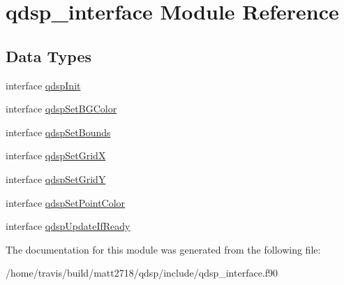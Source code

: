 \hypertarget{classqdsp__interface}{\section{qdsp\-\_\-interface Module Reference}
\label{classqdsp__interface}
}
\subsection*{Data Types}
\begin{DoxyCompactItemize}
\item 
interface \hyperlink{interfaceqdsp__interface_1_1qdspInit}{qdsp\-Init}
\item 
interface \hyperlink{interfaceqdsp__interface_1_1qdspSetBGColor}{qdsp\-Set\-B\-G\-Color}
\item 
interface \hyperlink{interfaceqdsp__interface_1_1qdspSetBounds}{qdsp\-Set\-Bounds}
\item 
interface \hyperlink{interfaceqdsp__interface_1_1qdspSetGridX}{qdsp\-Set\-Grid\-X}
\item 
interface \hyperlink{interfaceqdsp__interface_1_1qdspSetGridY}{qdsp\-Set\-Grid\-Y}
\item 
interface \hyperlink{interfaceqdsp__interface_1_1qdspSetPointColor}{qdsp\-Set\-Point\-Color}
\item 
interface \hyperlink{interfaceqdsp__interface_1_1qdspUpdateIfReady}{qdsp\-Update\-If\-Ready}
\end{DoxyCompactItemize}


The documentation for this module was generated from the following file\-:\begin{DoxyCompactItemize}
\item 
/home/travis/build/matt2718/qdsp/include/qdsp\-\_\-interface.\-f90\end{DoxyCompactItemize}
